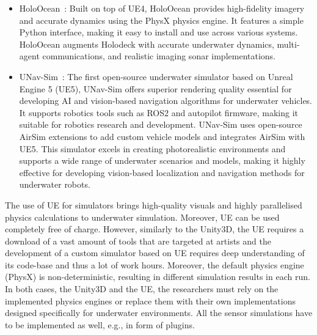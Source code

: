 \begin{itemize}
\item HoloOcean~\cite{potokar2022holoocean}: Built on top of UE4, HoloOcean provides high-fidelity imagery and accurate dynamics using the PhysX physics engine. It features a simple Python interface, making it easy to install and use across various systems. HoloOcean augments Holodeck with accurate underwater dynamics, multi-agent communications, and realistic imaging sonar implementations. 

\item UNav-Sim~\cite{amer2023unav}: The first open-source underwater simulator based on Unreal Engine 5 (UE5), UNav-Sim offers superior rendering quality essential for developing AI and vision-based navigation algorithms for underwater vehicles. It supports robotics tools such as ROS2 and autopilot firmware, making it suitable for robotics research and development. UNav-Sim uses open-source AirSim \cite{AirSim} extensions to add custom vehicle models and integrates AirSim with UE5. This simulator excels in creating photorealistic environments and supports a wide range of underwater scenarios and models, making it highly effective for developing vision-based localization and navigation methods for underwater robots.
\end{itemize}

The use of UE for simulators brings high-quality visuals and highly parallelised physics calculations to underwater simulation. Moreover, UE can be used completely free of charge.
%
However, similarly to the Unity3D, the UE requires a download of a vast amount of tools that are targeted at artists and the development of a custom simulator based on UE requires deep understanding of its code-base and thus a lot of work hours. Moreover, the default physics engine (PhysX) is non-deterministic, resulting in different simulation results in each run.
% 
In both cases, the Unity3D and the UE, the researchers must rely on the implemented physics engines or replace them with their own implementations designed specifically for underwater environments. All the sensor simulations have to be implemented as well, e.g., in form of plugins.